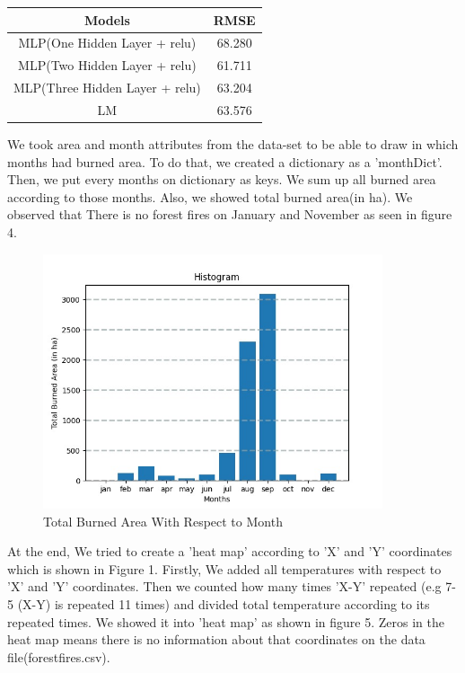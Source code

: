 \documentclass[onecolumn]{article}
\begin{document}
\begin{table}[htb!]
\centering
\begin{tabular}{|c|c|}
\hline
Models                         & RMSE   \\ \hline
MLP(One Hidden Layer + relu)   & 68.280 \\ \hline
MLP(Two Hidden Layer + relu)   & 61.711 \\ \hline
MLP(Three Hidden Layer + relu) & 63.204 \\ \hline
LM                             & 63.576 \\ \hline
\end{tabular}
\end{table}
We took area and month attributes from the data-set to be able to draw in which months had burned area. To do that, we created a dictionary as a 'monthDict'. Then, we put every months on dictionary as keys. We sum up all burned area according to those months. Also, we showed total burned area(in ha). We observed that There is no forest fires on January and November as seen in figure 4.

\begin{figure}[htb!]
\centerline
{\includegraphics[width=100mm,scale=1.0]{histogram.jpeg}}
\caption{Total Burned Area With Respect to Month }
\end{figure}

At the end, We tried to create a 'heat map' according to 'X' and 'Y' coordinates which is shown in Figure 1.  Firstly, We added all temperatures with respect to  'X' and 'Y' coordinates. Then we counted how many times 'X-Y' repeated (e.g 7-5 (X-Y) is repeated 11 times) and divided total temperature according to its repeated times. We showed it into 'heat map'  as shown in figure 5. Zeros in the heat map means there is no information about that coordinates on the data file(forestfires.csv).
\end{document}
